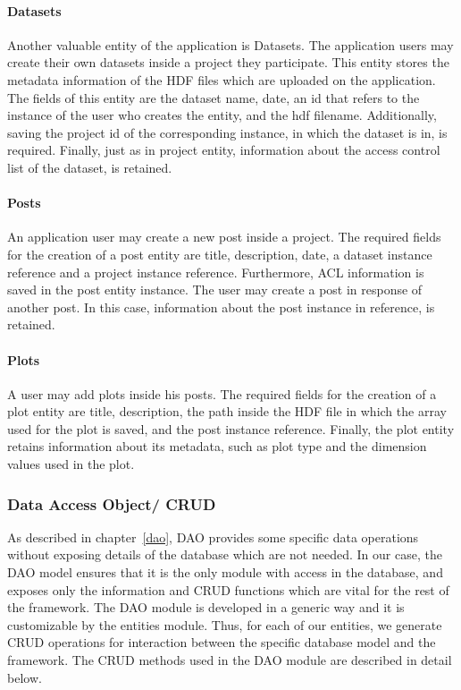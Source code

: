\paragraph{Datasets}
Another valuable entity of the application is Datasets. The application users may create their own datasets inside a project they participate. This entity stores the metadata information of the HDF files which are uploaded on the application. The fields of this entity are the dataset name, date, an id that refers to the instance of the user who creates the entity, and the hdf filename. Additionally, saving the project id of the corresponding instance, in which the dataset is in, is required. Finally, just as in project entity, information about the access control list of the dataset, is retained.
\paragraph{Posts}
An application user may create a new post inside a project. The required fields for the creation of a post entity are title, description, date, a dataset instance reference and a project instance reference. Furthermore, ACL information  is saved in the post entity instance. The user may create a post in response of another post. In this case, information about the post instance in reference, is retained.
\paragraph{Plots}
A user may add plots inside his posts. The required fields for the creation of a plot entity are title, description, the path inside the HDF file in which the array used for the plot is saved, and the post instance reference. Finally, the plot entity retains information about its metadata, such as plot type and the dimension values used in the plot.

\subsubsection{Data Access Object/ CRUD}
\label{daocrud}
As described in chapter~\ref{dao}, DAO provides some specific data operations without exposing details of the database which are not needed. In our case, the DAO model ensures that it is the only module with access in the database, and exposes only the information and CRUD functions which are vital for the rest of the framework. The DAO module is developed in a generic way and it is customizable by the entities module. Thus, for each of our entities, we generate CRUD operations for interaction between the specific database model and the framework. The CRUD methods used in the DAO module are described in detail below.


